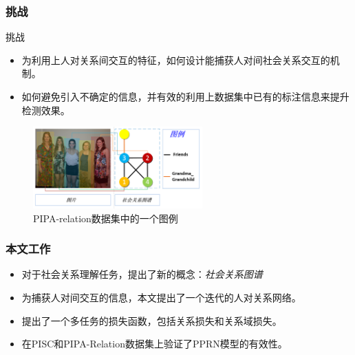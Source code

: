 \documentclass[UTF8]{beamer}
\begin{document}
\begin{frame}
\frametitle{挑战}
    \begin{block}{挑战}
        \begin{itemize}
            \item 为利用上人对关系间交互的特征，如何设计能捕获人对间社会关系交互的机制。
            \item 如何避免引入不确定的信息，并有效的利用上数据集中已有的标注信息来提升检测效果。
        \end{itemize}
    \end{block}
    \begin{figure}
        \centering
        \includegraphics[width=0.58\textwidth]{images/example-3.png}
        \caption{PIPA-relation\cite{sun2017a}数据集中的一个图例}
        \label{fig:example}
    \end{figure}
\end{frame}

\begin{frame}
    \frametitle{本文工作}

            \begin{itemize}
                \item 对于社会关系理解任务，提出了新的概念：{\it 社会关系图谱}
                \vspace*{1.5mm}
                \item 为捕获人对间交互的信息，本文提出了一个迭代的人对关系网络。
                \vspace*{1.5mm}
                \item 提出了一个多任务的损失函数，包括关系损失和关系域损失。
                \vspace*{1.5mm}
                \item 在PISC和PIPA-Relation数据集上验证了PPRN模型的有效性。
                \vspace*{1.5mm}
            \end{itemize}
\end{frame}
\end{document}
